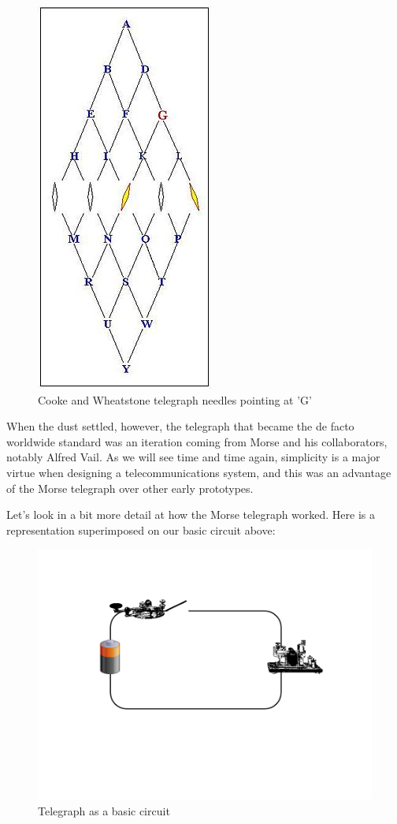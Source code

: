 \documentclass[UTF8]{book}
\begin{document}
\begin{CJK}{UTF8}{gbsn}
\begin{figure}[H]
\centering
\includegraphics[width=0.4\linewidth]{wheatstone}
\caption{Cooke and Wheatstone telegraph needles pointing at 'G'}
\end{figure}

When the dust settled, however, the telegraph that became the de facto worldwide standard was an iteration coming from Morse and his collaborators, notably Alfred Vail. As we will see time and time again, simplicity is a major virtue when designing a telecommunications system, and this was an advantage of the Morse telegraph over other early prototypes.

Let's look in a bit more detail at how the Morse telegraph worked. Here is a representation superimposed on our basic circuit above:

\begin{figure}[H]
\centering
\includegraphics[width=0.8\linewidth]{telegraph_as_circuit}
\caption{Telegraph as a basic circuit}
\end{figure}


\end{CJK}
\end{document}
